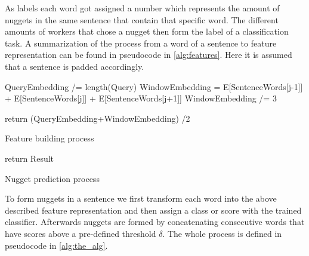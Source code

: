 \documentclass{article}
\begin{document}
As labels each word got assigned a number which represents the amount of nuggets in the same sentence that contain that specific word. The different amounts of workers that chose a nugget then form the label of a classification task. A summarization of the process from a word of a sentence to feature representation can be found in pseudocode in  \ref{alg:features}. Here it is assumed that a sentence is padded accordingly.

\begin{algorithm}
	\label{alg:features}


	QueryEmbedding /= length(Query)\;
	WindowEmbedding = E[SentenceWords[j-1]] + E[SentenceWords[j]] + E[SentenceWords[j+1]]\;
	WindowEmbedding /= 3\;


	return (QueryEmbedding+WindowEmbedding) /2 \;

	\caption{Feature building process}
\end{algorithm}


\begin{algorithm}
	\label{alg:the_alg}
	return Result \;

	\caption{Nugget prediction process}
\end{algorithm}
To form nuggets in a sentence we first transform each word into the above described feature representation and then assign a class or score with the trained classifier. Afterwards nuggets are formed by concatenating consecutive words that have scores above a pre-defined threshold $\delta$. The whole process is defined in pseudocode in \ref{alg:the_alg}.
\end{document}
